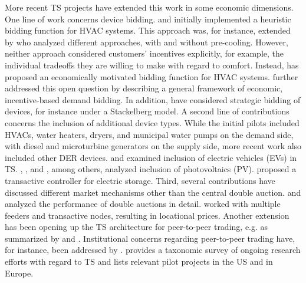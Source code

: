 More recent TS projects have extended this work in some economic dimensions. 
One line of work concerns device bidding.
\citet{PNNL2006} and \citet{hammerstrom_2008} initially implemented a heuristic bidding function for HVAC systems. This approach was, for instance, extended by \citet{adhikari_simulation_2016} who analyzed different approaches, with and without pre-cooling.
However, neither approach considered customers' incentives explicitly, for example, the individual tradeoffs they are willing to make with regard to comfort.
Instead, \citet{Arlt2020} has proposed an economically motivated bidding function for HVAC systems.
\citet{widergren_transactive_2017} further addressed this open question by describing a general framework of economic, incentive-based demand bidding.
In addition, \citet{lian_transactive_2020} have considered strategic bidding of devices, for instance under a Stackelberg model.
A second line of contributions concerns the inclusion of additional device types. While the initial pilots included HVACs, water heaters, dryers, and municipal water pumps on the demand side, with diesel and microturbine generators on the supply side, more recent work also included other DER devices.
\citet{behboodi_integration_2016} and \citet{behboodi_electric_2016} examined inclusion of electric vehicles (EVs) in TS. 
\citet{sajjadi_transactive_2016}, \citet{ableitner_user_2020}, and \citet{mengelkamp_decentralizing_2018}, among others, analyzed inclusion of photovoltaics (PV).
\citet{parandehgheibi_two-layer_2017} proposed a transactive controller for electric storage.
Third, several contributions have discussed different market mechanisms other than the central double auction. \citet{fuller_analysis_2011} and \citet{Arlt2020} analyzed the performance of double auctions in detail. \citet{widergren_residential_2014} worked with multiple feeders and transactive nodes, resulting in locational prices. Another extension has been opening up the TS architecture for peer-to-peer trading, e.g. as summarized by \citet{zhang_review_2017} and \citet{sousa_peer--peer_2019}.
Institutional concerns regarding peer-to-peer trading have, for instance, been addressed by \citet{masiello_sharing_2016}.
\citet{abrishambaf_towards_2019} provides a taxonomic survey of ongoing research efforts with regard to TS and lists relevant pilot projects in the US and in Europe. 

